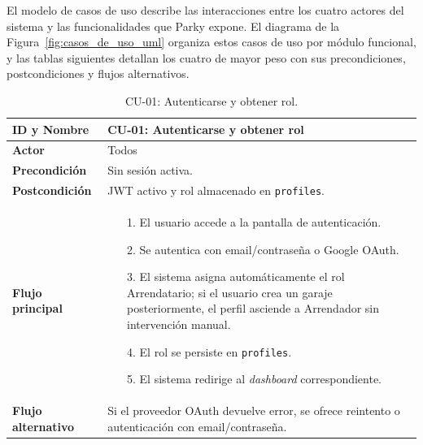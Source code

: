 El modelo de casos de uso describe las interacciones entre los cuatro actores del sistema y las funcionalidades que Parky expone. El diagrama de la Figura~\ref{fig:casos_de_uso_uml} organiza estos casos de uso por módulo funcional, y las tablas siguientes detallan los cuatro de mayor peso con sus precondiciones, postcondiciones y flujos alternativos.

\begin{table}[H]
  \centering
  \caption{CU-01: Autenticarse y obtener rol.}
  \label{tab:cu-01}
  \begin{tabularx}{\textwidth}{|>{\columncolor{gray!15}\bfseries}l|X|}
    \hline
    ID y Nombre       & CU-01: Autenticarse y obtener rol                                                                                                             \\ \hline
    Actor             & Todos                                                                                                                                             \\ \hline
    Precondición      & Sin sesión activa.                                                                                                                                \\ \hline
    Postcondición     & JWT activo y rol almacenado en \texttt{profiles}.                                                                                                 \\ \hline
    Flujo principal   &
    \begin{itemize}[leftmargin=3mm, itemsep=0mm, topsep=1mm]
      \item[1.] El usuario accede a la pantalla de autenticación.
      \item[2.] Se autentica con email/contraseña o Google OAuth.
      \item[3.] El sistema asigna automáticamente el rol Arrendatario; si el usuario crea un garaje posteriormente, el perfil asciende a Arrendador sin intervención manual.
      \item[4.] El rol se persiste en \texttt{profiles}.
      \item[5.] El sistema redirige al \textit{dashboard} correspondiente.
    \end{itemize} \\ \hline
    Flujo alternativo & Si el proveedor OAuth devuelve error, se ofrece reintento o autenticación con email/contraseña.                                                   \\ \hline
  \end{tabularx}
\end{table}

